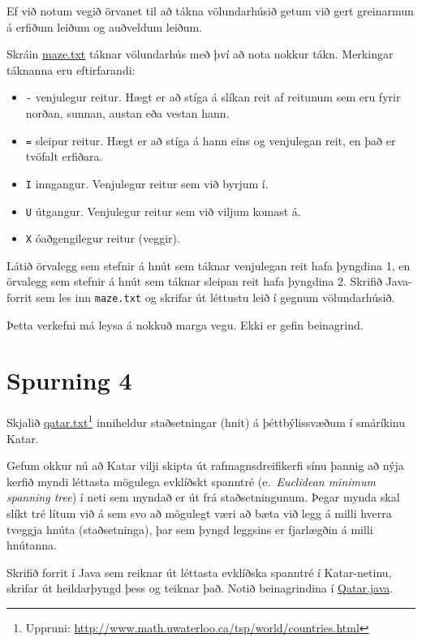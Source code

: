 \documentclass{article}
\begin{document}
Ef við notum vegið örvanet til að tákna völundarhúsið getum við gert greinarmun á erfiðum leiðum og auðveldum leiðum.

Skráin \href{https://github.com/Ernir/kennsluefni/tree/master/T2/Code/w11/maze.txt}{maze.txt} táknar völundarhús með því að nota nokkur tákn. Merkingar táknanna eru eftirfarandi:
\begin{itemize}
 \item \texttt{-} venjulegur reitur. Hægt er að stíga á slíkan reit af reitunum sem eru fyrir norðan, sunnan, austan eða vestan hann.
 \item \texttt{=} sleipur reitur. Hægt er að stíga á hann eins og venjulegan reit, en það er tvöfalt erfiðara.
 \item \texttt{I} inngangur. Venjulegur reitur sem við byrjum í.
 \item \texttt{U} útgangur. Venjulegur reitur sem við viljum komast á.
 \item \texttt{X} óaðgengilegur reitur (veggir).
\end{itemize}

Látið örvalegg sem stefnir á hnút sem táknar venjulegan reit hafa þyngdina 1, en örvalegg sem stefnir á hnút sem táknar sleipan reit hafa þyngdina 2. Skrifið Java-forrit sem les inn \texttt{maze.txt} og skrifar út léttustu leið í gegnum völundarhúsið.

Þetta verkefni má leysa á nokkuð marga vegu. Ekki er gefin beinagrind.

\section{Spurning 4}
Skjalið \href{https://github.com/Ernir/kennsluefni/tree/master/T2/Code/w11/qatar.txt}{qatar.txt}\footnote{Uppruni: \url{http://www.math.uwaterloo.ca/tsp/world/countries.html}} inniheldur staðsetningar (hnit) á þéttbýlissvæðum í smáríkinu Katar.

Gefum okkur nú að Katar vilji skipta út rafmagnsdreifikerfi sínu þannig að nýja kerfið myndi léttasta mögulega evklíðskt spanntré (e.\ \emph{Euclidean minimum spanning tree}) í neti sem myndað er út frá staðsetningunum. Þegar mynda skal slíkt tré lítum við á sem svo að mögulegt væri að bæta við legg á milli hverra tveggja hnúta (staðsetninga), þar sem þyngd leggsins er fjarlægðin á milli hnútanna.

Skrifið forrit í Java sem reiknar út léttasta evklíðska spanntré í Katar-netinu, skrifar út heildarþyngd þess og teiknar það. Notið beinagrindina í \href{https://github.com/Ernir/kennsluefni/tree/master/T2/Code/w11/Qatar.java}{Qatar.java}.
\end{document}
